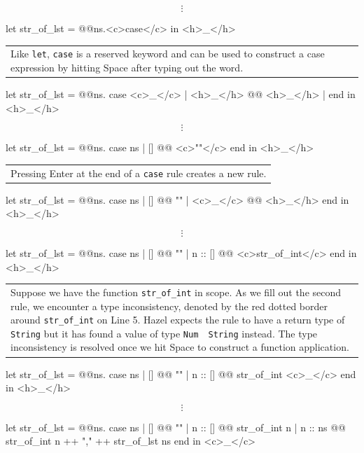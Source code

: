 \documentclass[runningheads]{llncs}
\newcommand{\Hazel}{\textsf{Hazel}\xspace}
\begin{document}
	\[\vdots\]
\begin{hazel}
let str_of_lst = @\lam @ns.{<c>case</c>} in
<h>_</h>
\end{hazel}
	\begin{tabular}{|p{\linewidth}}
	Like \texttt{let}, \texttt{case} is a reserved keyword and can be used to construct
	a case expression by hitting Space after typing out the word.
	\end{tabular}
\begin{hazel}
let str_of_lst = 
	@\lam @ns.{
		case <c>_</c>
		| <h>_</h> @\casearrow @ <h>_</h> |
		end
	}
in
<h>_</h>
\end{hazel}
	\[\vdots\]
\begin{hazel}
let str_of_lst = 
	@\lam @ns.{
		case ns
		| [] @\casearrow @ <c>""</c>
		end
	}
in
<h>_</h>
\end{hazel}
	\begin{tabular}{|p{\linewidth}}
	Pressing Enter at the end of a \texttt{case} rule creates a new rule.
	\end{tabular}
\begin{hazel}
let str_of_lst = 
	@\lam @ns.{
		case ns
		| [] @\casearrow @ ""
		| <c>_</c>  @\casearrow @ <h>_</h>
		end
	}
in
<h>_</h>
\end{hazel}
	\[\vdots\]
\begin{hazel}
let str_of_lst = 
	@\lam @ns.{
		case ns
		| []      @\casearrow @ ""
		| n :: [] @\casearrow @ <c>str_of_int</c>
		end
	}
in
<h>_</h>
\end{hazel}
	\begin{tabular}{|p{\linewidth}}
	Suppose we have the function \texttt{str\_of\_int} in scope.
	As we fill out the second rule, we encounter a type inconsistency,
	denoted by the red dotted border around \texttt{str\_of\_int} on
	Line 5. \Hazel expects the rule to have a return type of \texttt{String}
	but it has found a value of type \texttt{Num \fnarrow~String} instead.
	The type inconsistency is resolved once we hit Space to construct
	a function application.
	\end{tabular}
\begin{hazel}
let str_of_lst = 
	@\lam @ns.{
		case ns
		| []      @\casearrow @ ""
		| n :: [] @\casearrow @ str_of_int <c>_</c>
		end
	}
in
<h>_</h>
\end{hazel}
	\[\vdots\]
\begin{hazel}
let str_of_lst = 
	@\lam @ns.{
		case ns
		| []      @\casearrow @ ""
		| n :: [] @\casearrow @ str_of_int n		
		| n :: ns @\casearrow @ str_of_int n ++ "," ++ str_of_lst ns
		end
	}
in
<c>_</c>
\end{hazel}
\end{document}
